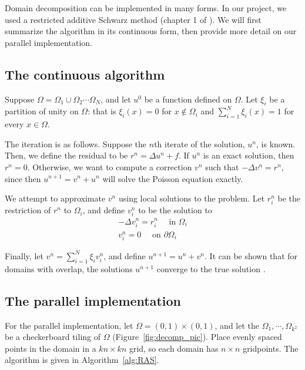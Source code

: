 \documentclass{article}
\begin{document}
	Domain decomposition can be implemented in many forms.  In our project, we used a restricted additive Schwarz method (chapter 1 of \cite{Dolean15}).  We will first summarize the algorithm in its continuous form, then provide more detail on our parallel implementation.
	
	\subsection{The continuous algorithm}
	
	Suppose \(\Omega = \Omega_1 \cup \Omega_2 \cdots \Omega_N\), and let \(u^0\) be a function defined on \(\Omega\).  Let \(\xi_i\) be a partition of unity on \(\Omega\): that is \(\xi_i(x) = 0\) for \(x \not\in \Omega_i\) and \(\sum_{i=1}^N \xi_i(x) = 1\) for every \(x \in \Omega\).
	
	The iteration is as follows.  Suppose the \(n\)th iterate of the solution, \(u^n\), is known.  Then, we define the residual to be \(r^n = \Delta u^n + f\).  If \(u^n\) is an exact solution, then \(r^n = 0\).  Otherwise, we want to compute a correction \(v^n\) such that \(-\Delta v^n = r^n\), since then \(u^{n+1} = v^n + u^n\) will solve the Poisson equation exactly.  
	
	We attempt to approximate \(v^n\) using local solutions to the problem.  Let \(r^n_i\) be the restriction of \(r^n\) to \(\Omega_i\), and define \(v^n_i\) to be the solution to 
	\begin{equation}
	\begin{split}
	-\Delta v^n_i = r^n_i\quad \text{ in } \Omega_i\\
	v^n_i = 0 \quad \text{ on } \partial\Omega_i
	\end{split}
	\end{equation}
	
	Finally, let \(v^n = \sum_{i=1}^N\xi_iv^n_i\), and define \(u^{n+1} = u^n + v^n\).  It can be shown that for domains with overlap, the solutions \(u^{n+1}\) converge to the true solution \cite{Dolean15}.
	
	\subsection{The parallel implementation}
	
	For the parallel implementation, let \(\Omega = (0,1)\times(0,1)\), and let the \(\Omega_1, \cdots, \Omega_{k^2}\) be a checkerboard tiling of \(\Omega\) (Figure~\ref{fig:decomp_pic}).  Place evenly spaced points in the domain in a \(kn \times kn\) grid, so each domain has \(n \times n\) gridpoints.  The algorithm is given in Algorithm~\ref{alg:RAS}.  
	
\end{document}
